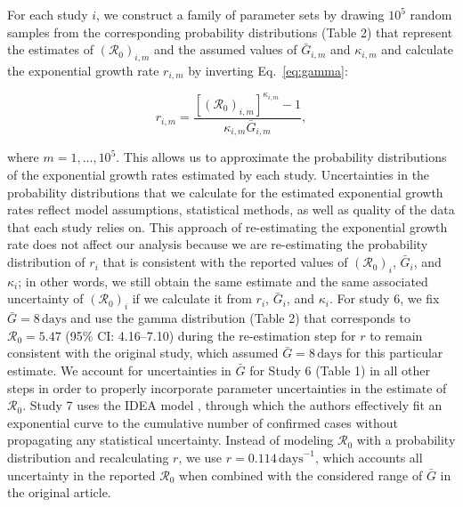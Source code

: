 \documentclass[12pt]{article}
\newcommand{\eref}[1]{Eq.~\ref{eq:#1}}
\newcommand{\Ro}{\ensuremath{{\mathcal R}_{0}}\xspace}
\begin{document}
For each study $i$, we construct a family of parameter sets by drawing $10^5$ random samples from the corresponding probability distributions (Table 2) that represent the estimates of $(\Ro)_{i,m}$ and the assumed values of $\bar G_{i,m}$ and $\kappa_{i,m}$ and calculate the exponential growth rate $r_{i,m}$ by inverting \eref{gamma}:
\begin{linenomath*}
\begin{equation}
r_{i,m} = \frac{\left[(\Ro)_{i,m}\right]^{\kappa_{i,m}} - 1}{\kappa_{i,m} \bar{G}_{i,m}},
\end{equation}
\end{linenomath*}
where $m=1,\dots,10^5$.
This allows us to approximate the probability distributions of the exponential growth rates estimated by each study.
Uncertainties in the probability distributions that we calculate for the estimated exponential growth rates reflect model assumptions, statistical methods, as well as quality of the data that each study relies on.
This approach of re-estimating the exponential growth rate does not affect our analysis because we are re-estimating the probability distribution of $r_i$ that is consistent with the reported values of $(\Ro)_i$, $\bar G_i$, and $\kappa_i$;
in other words, we still obtain the same estimate and the same associated uncertainty of $(\Ro)_i$ if we calculate it from $r_i$, $\bar G_i$, and $\kappa_i$.
For study 6, we fix $\bar G=8\,\textrm{days}$ and use the gamma distribution (Table 2) that corresponds to $\mathcal R_0 = 5.47$ (95\% CI: 4.16--7.10) during the re-estimation step for $r$ to remain consistent with the original study, which assumed $\bar G=8\,\textrm{days}$ for this particular estimate.
We account for uncertainties in $\bar G$ for Study 6 (Table 1) in all other steps in order to properly incorporate parameter uncertainties in the estimate of \Ro.
Study 7 uses the IDEA model \citep{fisman2013idea}, through which the authors effectively fit an exponential curve to the cumulative number of confirmed cases without propagating any statistical uncertainty.
Instead of modeling \Ro with a probability distribution and recalculating $r$, we use $r=0.114\,\mathrm{days}^{-1}$, which accounts all uncertainty in the reported \Ro when combined with the considered range of $\bar G$ in the original article.
\end{document}
